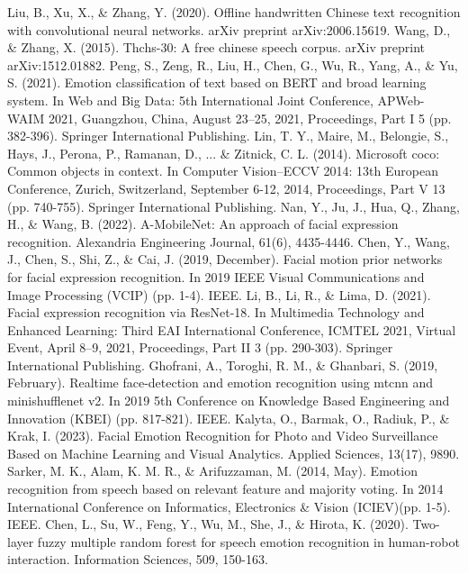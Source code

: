 \documentclass[preprint,12pt]{elsarticle}
\begin{document}
\begin{thebibliography}{99}
 Liu, B., Xu, X., \& Zhang, Y. (2020). Offline handwritten Chinese text recognition with convolutional neural networks. arXiv preprint arXiv:2006.15619.
 Wang, D., \& Zhang, X. (2015). Thchs-30: A free chinese speech corpus. arXiv preprint arXiv:1512.01882.
 Peng, S., Zeng, R., Liu, H., Chen, G., Wu, R., Yang, A., \& Yu, S. (2021). Emotion classification of text based on BERT and broad learning system. In Web and Big Data: 5th International Joint Conference, APWeb-WAIM 2021, Guangzhou, China, August 23–25, 2021, Proceedings, Part I 5 (pp. 382-396). Springer International Publishing.
 Lin, T. Y., Maire, M., Belongie, S., Hays, J., Perona, P., Ramanan, D., ... \& Zitnick, C. L. (2014). Microsoft coco: Common objects in context. In Computer Vision–ECCV 2014: 13th European Conference, Zurich, Switzerland, September 6-12, 2014, Proceedings, Part V 13 (pp. 740-755). Springer International Publishing.
 Nan, Y., Ju, J., Hua, Q., Zhang, H., \& Wang, B. (2022). A-MobileNet: An approach of facial expression recognition. Alexandria Engineering Journal, 61(6), 4435-4446.
 Chen, Y., Wang, J., Chen, S., Shi, Z., \& Cai, J. (2019, December). Facial motion prior networks for facial expression recognition. In 2019 IEEE Visual Communications and Image Processing (VCIP) (pp. 1-4). IEEE.
 Li, B., Li, R., \& Lima, D. (2021). Facial expression recognition via ResNet-18. In Multimedia Technology and Enhanced Learning: Third EAI International Conference, ICMTEL 2021, Virtual Event, April 8–9, 2021, Proceedings, Part II 3 (pp. 290-303). Springer International Publishing.
 Ghofrani, A., Toroghi, R. M., \& Ghanbari, S. (2019, February). Realtime face-detection and emotion recognition using mtcnn and minishufflenet v2. In 2019 5th Conference on Knowledge Based Engineering and Innovation (KBEI) (pp. 817-821). IEEE.
 Kalyta, O., Barmak, O., Radiuk, P., \& Krak, I. (2023). Facial Emotion Recognition for Photo and Video Surveillance Based on Machine Learning and Visual Analytics. Applied Sciences, 13(17), 9890.
 Sarker, M. K., Alam, K. M. R., \& Arifuzzaman, M. (2014, May). Emotion recognition from speech based on relevant feature and majority voting. In 2014 International Conference on Informatics, Electronics \& Vision (ICIEV)(pp. 1-5). IEEE.
 Chen, L., Su, W., Feng, Y., Wu, M., She, J., \& Hirota, K. (2020). Two-layer fuzzy multiple random forest for speech emotion recognition in human-robot interaction. Information Sciences, 509, 150-163.

\end{thebibliography}
\end{document}
